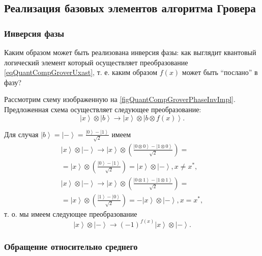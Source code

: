 \subsection{ Реализация базовых элементов алгоритма Гровера}

\subsubsection{Инверсия фазы}
Каким образом может быть реализована инверсия фазы: как выглядит
квантовый логический элемент который осуществляет преобразование
\eqref{eqQuantCompGroverUxast}, т. е. каким образом $f\left(x\right)$
может быть ``послано'' в фазу?



Рассмотрим схему изображенную на
\autoref{figQuantCompGroverPhaseInvImpl}. Предложенная схема
осуществляет следующее преобразование:
\begin{equation}
\left|x\right>\otimes\left|b\right> \rightarrow 
\left|x\right>\otimes\left|b\otimes f\left(x\right)\right>.
\nonumber
\end{equation}

Для случая $\left|b\right> = \left|-\right> = 
\frac{\left|0\right> - \left|1\right>}{\sqrt{2}}$ имеем
\begin{eqnarray}
\left|x\right>\otimes\left|-\right> \rightarrow 
\left|x\right>\otimes\left(\frac{\left|0\otimes 0\right> -
  \left|1\otimes 0\right>}{\sqrt{2}}\right) = 
\nonumber \\
= \left|x\right>\otimes\left(\frac{\left|0\right> -
  \left|1\right>}{\sqrt{2}}\right) =
\left|x\right>\otimes\left|-\right>
, x \ne x^{\ast},
\nonumber \\
\left|x\right>\otimes\left|-\right> \rightarrow 
\left|x\right>\otimes\left(\frac{\left|0\otimes 1\right> -
  \left|1\otimes 1\right>}{\sqrt{2}}\right) = 
\nonumber \\
= \left|x\right>\otimes\left(\frac{\left|1\right> -
  \left|0\right>}{\sqrt{2}}\right) =
- \left|x\right>\otimes\left|-\right>
, x = x^{\ast},
\nonumber
\end{eqnarray}
т. о. мы имеем следующее преобразование
\begin{equation}
\left|x\right>\otimes\left|-\right> \rightarrow 
\left(-1\right)^{f\left(x\right)}\left|x\right>\otimes\left|-\right>.
\label{eqQuantCompGroverPhaseInvImpl}
\end{equation}

\subsubsection{Обращение относительно среднего}

